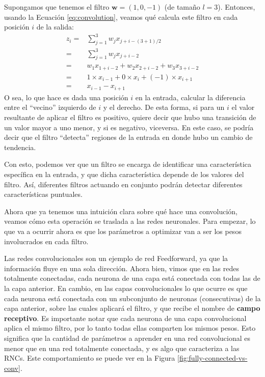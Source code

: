 \documentclass[../../main.tex]{subfiles}
\begin{document}
Supongamos que tenemos el filtro \(\bm{w} = (1, 0, -1)\) (de tamaño \(l=3\)). Entonces,
usando la Ecuación \ref{eq:convolution}, veamos qué calcula este filtro en cada
posición \(i\) de la salida:
\begin{align*}
    z_i =& \sum_{j=1}^3 w_j x_{j+i-(3+1)/2} \\
        =& \sum_{j=1}^3 w_j x_{j+i-2} \\
        =& w_1 x_{1+i-2} + w_2 x_{2+i-2} + w_3 x_{3+i-2} \\
        =& 1 \times x_{i-1} + 0 \times x_i + (-1) \times x_{i+1} \\
        =& x_{i-1} - x_{i+1}
\end{align*}
O sea, lo que hace es dada una posición \(i\) en la entrada, calcular la diferencia entre
el ``vecino'' izquierdo de \(i\) y el derecho. De esta forma, si para un \(i\) el valor
resultante de aplicar el filtro es positivo, quiere decir que hubo una transición de un
valor mayor a uno menor, y si es negativo, viceversa. En este caso, se podría decir que el
filtro ``detecta'' regiones de la entrada en donde hubo un cambio de tendencia.

Con esto, podemos ver que un filtro se encarga de identificar una característica
específica en la entrada, y que dicha característica depende de los valores del filtro.
Así, diferentes filtros actuando en conjunto podrán detectar diferentes características
puntuales.

Ahora que ya tenemos una intuición clara sobre qué hace una convolución, veamos
cómo esta operación se traslada a las redes neuronales. Para empezar, lo que va a
ocurrir ahora es que los parámetros a optimizar van a ser los pesos involucrados
en cada filtro.

Las redes convolucionales son un ejemplo de red Feedforward, ya que la información fluye
en una sola dirección. Ahora bien, vimos que en las redes totalmente conectadas, cada
neurona de una capa está conectada con todas las de la capa anterior. En cambio, en las
capas convolucionales lo que ocurre es que cada neurona está conectada con un subconjunto
de neuronas (consecutivas) de la capa anterior, sobre las cuales aplicará el filtro, y que
recibe el nombre de \textbf{campo receptivo}. Es importante notar que cada neurona de una
capa convolucional aplica el mismo filtro, por lo tanto todas ellas comparten los mismos
pesos. Esto significa que la cantidad de parámetros a aprender en una red convolucional es
menor que en una red totalmente conectada, y es algo que caracteriza a las RNCs. Este
comportamiento se puede ver en la Figura \ref{fig:fully-connected-vs-conv}.
\end{document}
